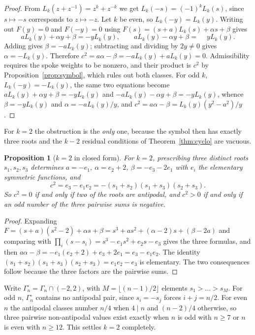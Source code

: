 \documentclass[11pt]{article}
\newtheorem{proposition}[theorem]{Proposition}
\theoremstyle{definition}
\begin{document}
\begin{proof}
From $L_k(z+z^{-1})=z^{k}+z^{-k}$ we get $L_k(-s)=(-1)^{k}L_k(s)$, since
$s\mapsto-s$ corresponds to $z\mapsto-z$. Let $k$ be even, so
$L_k(-y)=L_k(y)$. Writing out $F(y)=0$ and $F(-y)=0$ using
$F(s)=(s+a)L_k(s)+\alpha s+\beta$ gives
\[
  aL_k(y)+\alpha y+\beta=-yL_k(y),\qquad
  aL_k(y)-\alpha y+\beta=\phantom{-}yL_k(y).
\]
Adding gives $\beta=-aL_k(y)$; subtracting and dividing by $2y\ne0$ gives
$\alpha=-L_k(y)$. Therefore
$c^{2}=a\alpha-\beta=-aL_k(y)+aL_k(y)=0$. Admissibility requires the spoke
weights to be nonzero, and their product is $c^{2}$ by
Proposition~\ref{prop:symbol}, which rules out both classes. For odd $k$,
$L_k(-y)=-L_k(y)$, the same two equations become
$aL_k(y)+\alpha y+\beta=-yL_k(y)$ and $-aL_k(y)-\alpha y+\beta=-yL_k(y)$,
whence $\beta=-yL_k(y)$ and $\alpha=-aL_k(y)/y$, and
$c^{2}=a\alpha-\beta=L_k(y)(y^{2}-a^{2})/y$.
\end{proof}

For $k=2$ the obstruction is the \emph{only} one, because the symbol then has
exactly three roots and the $k-2$ residual conditions of
Theorem~\ref{thm:cyclo} are vacuous.

\begin{proposition}[$k=2$ in closed form]\label{prop:k2closed}
For $k=2$, prescribing three distinct roots $s_1,s_2,s_3$ determines
$a=-e_1$, $\alpha=e_2+2$, $\beta=-e_3-2e_1$ with $e_i$ the elementary
symmetric functions, and
\[
  c^{2}=e_3-e_1e_2=-(s_1+s_2)(s_1+s_3)(s_2+s_3).
\]
So $c^{2}=0$ if and only if two of the roots are antipodal, and $c^{2}>0$ if
and only if an odd number of the three pairwise sums is negative.
\end{proposition}

\begin{proof}
Expanding $F=(s+a)(s^{2}-2)+\alpha s+\beta
=s^{3}+as^{2}+(\alpha-2)s+(\beta-2a)$ and comparing with
$\prod_i(s-s_i)=s^{3}-e_1s^{2}+e_2s-e_3$ gives the three formulas, and then
$a\alpha-\beta=-e_1(e_2+2)+e_3+2e_1=e_3-e_1e_2$. The identity
$(s_1+s_2)(s_1+s_3)(s_2+s_3)=e_1e_2-e_3$ is elementary. The two consequences
follow because the three factors are the pairwise sums.
\end{proof}

\noindent
Write $\Gamma^{\circ}_n=\Gamma_n\cap(-2,2)$, with $M=\lfloor(n-1)/2\rfloor$
elements $s_1>\dots>s_M$. For odd $n$, $\Gamma^{\circ}_n$ contains no
antipodal pair, since $s_i=-s_j$ forces $i+j=n/2$. For even $n$ the antipodal
classes number $n/4$ when $4\mid n$ and $(n-2)/4$ otherwise, so three pairwise
non-antipodal values exist exactly when $n$ is odd with $n\ge7$ or $n$ is even
with $n\ge12$. This settles $k=2$ completely.
\end{document}
